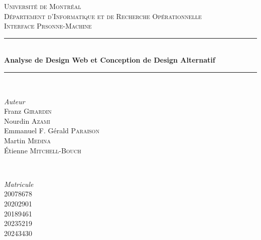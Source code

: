 \documentclass[9pt]{report}
\begin{document}
\begin{titlepage} %
	\newcommand{\HRule}{\rule{\linewidth}{0.5mm}} %
	
	\center %
	
	
	\textsc{\LARGE Université de Montréal}\\[1.5cm] %
	
	\textsc{\Large Département d'Informatique et de Recherche Opérationnelle}\\[0.5cm] %
	
	\textsc{\large Interface Prsonne-Machine}\\[0.5cm] %
	
	
	\HRule\\[0.4cm]
	
	{\huge\bfseries Analyse de Design Web et Conception de Design Alternatif}\\[0.4cm] %
	
	\HRule\\[1.5cm]
	
	
	\begin{minipage}{0.4\textwidth}
		\begin{flushleft}
			\large
			\textit{Auteur}\\
		Franz \textsc{Girardin} \\ %
		Nourdin \textsc{Azami} \\ 
    Emmanuel F. Gérald \textsc{Paraison} \\ %
  	Martin \textsc{Medina} \\
    Étienne \textsc{Mitchell-Bouch}
		\end{flushleft}
	\end{minipage}
	~
	\begin{minipage}{0.4\textwidth}
		\begin{flushright}
			\large
			\textit{Matricule}\\
			\textsc{20078678} \\ %
			\textsc{20202901} \\ 
      \textsc{20189461} \\%
      \textsc{20235219} \\ 
      \textsc{20243430}
		\end{flushright}
	\end{minipage}
	

\end{titlepage}
\end{document}
